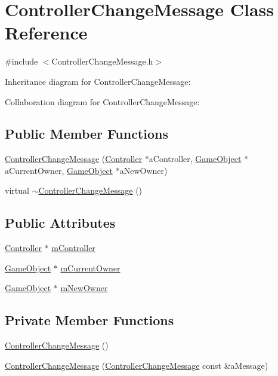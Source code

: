 \hypertarget{classControllerChangeMessage}{}\section{Controller\+Change\+Message Class Reference}
\label{classControllerChangeMessage}


{\ttfamily \#include $<$Controller\+Change\+Message.\+h$>$}



Inheritance diagram for Controller\+Change\+Message\+:


Collaboration diagram for Controller\+Change\+Message\+:
\subsection*{Public Member Functions}
\begin{DoxyCompactItemize}
\item 
\hyperlink{classControllerChangeMessage_a4fe5bc4ea8cce13ff5c0737cff1ff8e3}{Controller\+Change\+Message} (\hyperlink{classController}{Controller} $\ast$a\+Controller, \hyperlink{classGameObject}{Game\+Object} $\ast$a\+Current\+Owner, \hyperlink{classGameObject}{Game\+Object} $\ast$a\+New\+Owner)
\item 
virtual \hyperlink{classControllerChangeMessage_ab64422ad6a28389930ab8c9063da9c74}{$\sim$\+Controller\+Change\+Message} ()
\end{DoxyCompactItemize}
\subsection*{Public Attributes}
\begin{DoxyCompactItemize}
\item 
\hyperlink{classController}{Controller} $\ast$ \hyperlink{classControllerChangeMessage_a1ab3443d5f211165cde6ec8d92f0e123}{m\+Controller}
\item 
\hyperlink{classGameObject}{Game\+Object} $\ast$ \hyperlink{classControllerChangeMessage_a88d1428fc03e972c4ea807936264f579}{m\+Current\+Owner}
\item 
\hyperlink{classGameObject}{Game\+Object} $\ast$ \hyperlink{classControllerChangeMessage_a7781bcb8ef17a2ef18e4098634a03fd7}{m\+New\+Owner}
\end{DoxyCompactItemize}
\subsection*{Private Member Functions}
\begin{DoxyCompactItemize}
\item 
\hyperlink{classControllerChangeMessage_a0acabf89ce0e9a78d3269c3d2fdcc4c5}{Controller\+Change\+Message} ()
\item 
\hyperlink{classControllerChangeMessage_ae556e3f9bed05678c0f910e7b1f14629}{Controller\+Change\+Message} (\hyperlink{classControllerChangeMessage}{Controller\+Change\+Message} const \&a\+Message)
\end{DoxyCompactItemize}
